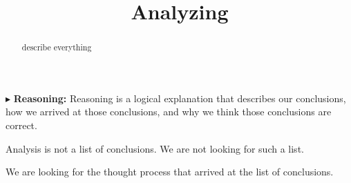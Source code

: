 \documentclass{ximera}
\title{Analyzing}
\begin{document}
\begin{abstract}
describe everything
\end{abstract}
\maketitle



$\blacktriangleright$ \textbf{\textcolor{red!70!black}{Reasoning:}} Reasoning is a logical explanation that describes our conclusions, how we arrived at those conclusions, and why we think those conclusions are correct. 

Analysis is not a list of conclusions. We are not looking for such a list. 

We are looking for the thought process that arrived at the list of conclusions. 
\end{document}
